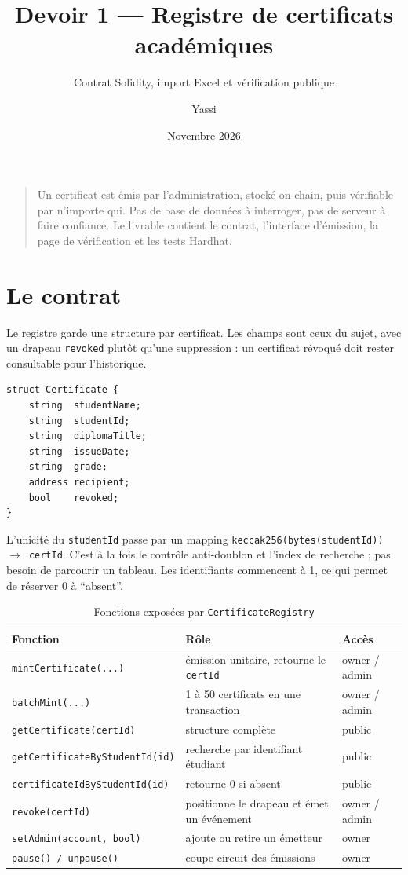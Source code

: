 \documentclass[11pt,a4paper,parskip=half]{scrartcl}
\title{Devoir 1 --- Registre de certificats académiques}
\subtitle{Contrat Solidity, import Excel et vérification publique}
\author{Yassi}
\date{Novembre 2026}
\begin{document}
\maketitle

\begin{quote}
\small
Un certificat est émis par l'administration, stocké on-chain, puis vérifiable par
n'importe qui. Pas de base de données à interroger, pas de serveur à faire confiance.
Le livrable contient le contrat, l'interface d'émission, la page de vérification et
les tests Hardhat.
\end{quote}

\section{Le contrat}

Le registre garde une structure par certificat. Les champs sont ceux du sujet, avec
un drapeau \texttt{revoked} plutôt qu'une suppression : un certificat révoqué doit
rester consultable pour l'historique.

\begin{lstlisting}
struct Certificate {
    string  studentName;
    string  studentId;
    string  diplomaTitle;
    string  issueDate;
    string  grade;
    address recipient;
    bool    revoked;
}
\end{lstlisting}

L'unicité du \texttt{studentId} passe par un mapping
\texttt{keccak256(bytes(studentId)) $\to$ certId}. C'est à la fois le contrôle
anti-doublon et l'index de recherche ; pas besoin de parcourir un tableau.
Les identifiants commencent à 1, ce qui permet de réserver 0 à ``absent''.

\begin{table}[htbp]
\centering
\caption{Fonctions exposées par \texttt{CertificateRegistry}}
\small
\begin{tabularx}{\textwidth}{@{}lXl@{}}
\toprule
Fonction & Rôle & Accès \\
\midrule
\texttt{mintCertificate(...)} & émission unitaire, retourne le \texttt{certId} & owner / admin \\
\texttt{batchMint(...)} & 1 à 50 certificats en une transaction & owner / admin \\
\texttt{getCertificate(certId)} & structure complète & public \\
\texttt{getCertificateByStudentId(id)} & recherche par identifiant étudiant & public \\
\texttt{certificateIdByStudentId(id)} & retourne 0 si absent & public \\
\texttt{revoke(certId)} & positionne le drapeau et émet un événement & owner / admin \\
\texttt{setAdmin(account, bool)} & ajoute ou retire un émetteur & owner \\
\texttt{pause() / unpause()} & coupe-circuit des émissions & owner \\
\bottomrule
\end{tabularx}
\end{table}
\end{document}

